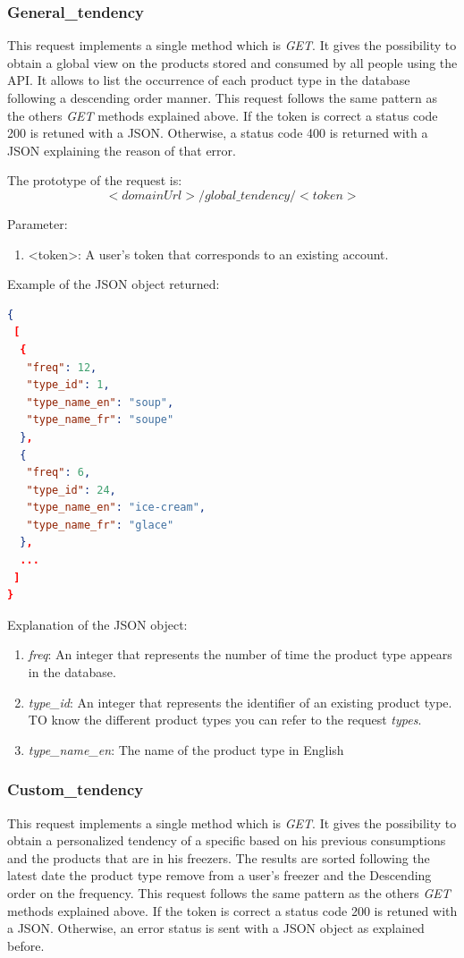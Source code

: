 \subsubsection{General\_tendency}
This request implements a single method which is \textit{GET}. It gives the possibility to obtain a global view on the products stored and consumed by all people using the API. It allows to list the occurrence of each product type in the database following a descending order manner. This request follows the same pattern as the others \textit{GET} methods explained above. If the token is correct a status code 200 is retuned with a JSON. Otherwise, a status code 400 is returned with a JSON explaining the reason of that error.

The prototype of the request is:
$$<domainUrl>/global\_tendency/<token>$$

Parameter:
\begin{enumerate}
\item <token>: A user's token that corresponds to an existing account.
\end{enumerate}

Example of the JSON object returned:
\begin{lstlisting}[language=json]
{
 [
  {
   "freq": 12,
   "type_id": 1,
   "type_name_en": "soup",
   "type_name_fr": "soupe"
  },
  {
   "freq": 6,
   "type_id": 24,
   "type_name_en": "ice-cream",
   "type_name_fr": "glace"
  },
  ...
 ]
}
\end{lstlisting}

Explanation of the  JSON object:
\begin{enumerate}
\item \textit{freq}: An integer that represents the number of time the product type appears in the database.
\item \textit{type\_id}: An integer that represents the identifier of an existing product type. TO know the different product types you can refer to the request \textit{types}.
\item \textit{type\_name\_en}: The name of the product type in English
\end{enumerate}

\subsubsection{Custom\_tendency}
This request implements a single method which is \textit{GET}. It gives the possibility to obtain a personalized tendency of a specific based on his previous consumptions and the products that are in his freezers. The results are sorted following the latest date the product type remove from a user's freezer and the Descending order on the frequency. This request follows the same pattern as the others \textit{GET} methods explained above. If the token is correct a status code 200 is retuned with a JSON. Otherwise, an error status is sent with a JSON object as explained before.\\

